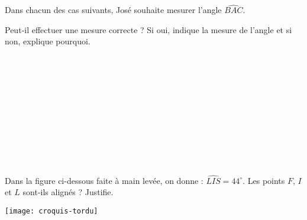 \begin{exercice}
Dans chacun des cas suivants, José souhaite mesurer l'angle $\widehat{BAC}$.

Peut‑il effectuer une mesure correcte ? Si oui, indique la mesure de l'angle et si non, explique pourquoi. \\[0.5em]
\begin{colenumerate}{1}
 \item \\
 \begin{center}\end{center}
\item \\
 \begin{center}\end{center}
 \item \\
  \begin{center}\end{center}
 \item \\
\begin{center}\end{center}
 \item \\
\begin{center}\end{center}
 \item \\
\begin{center}\end{center}
 \end{colenumerate}
\end{exercice}  


\begin{exercice}[Alignés ?]
Dans la figure ci-dessous faite à main levée, on donne : $\widehat{LIS}= 44^\circ$.
Les points $F$, $I$ et $L$ sont-ils alignés ? Justifie.
 \begin{center} \texttt{[image: croquis-tordu]} \end{center}
\end{exercice} 



